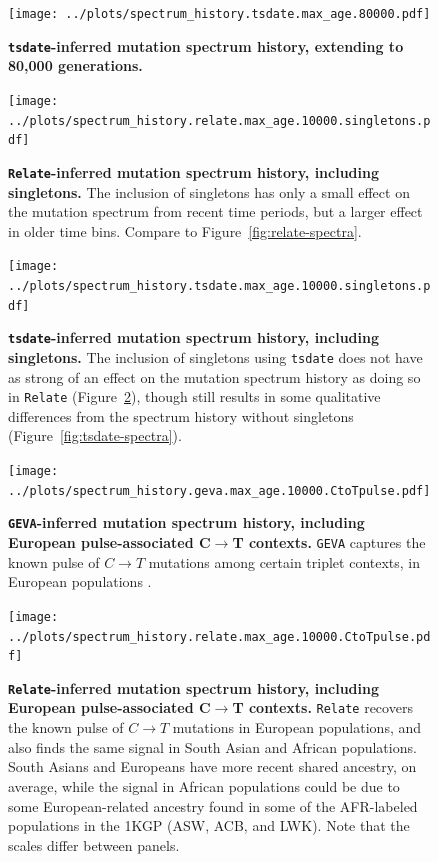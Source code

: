 \documentclass[]{article}
\newcommand{\GEVA}{\texttt{GEVA}\xspace}
\newcommand{\tsdate}{\texttt{tsdate}\xspace}
\newcommand{\relate}{\texttt{Relate}\xspace}
\begin{document}
\begin{figure}[ht!]
    \centering
    \texttt{[image: ../plots/spectrum\_history.tsdate.max\_age.80000.pdf]}
    \caption{
        \textbf{\tsdate-inferred mutation spectrum history, extending to 80,000 generations.}
    }
    \label{fig:geva-spectra-80k}
\end{figure}


\begin{figure}[ht!]
    \centering
    \texttt{[image: ../plots/spectrum\_history.relate.max\_age.10000.singletons.pdf]}
    \caption{
        \textbf{\relate-inferred mutation spectrum history, including singletons.}
        The inclusion of singletons has only a small effect on the mutation spectrum from
        recent time periods, but a larger effect in older time bins.
        Compare to Figure~\ref{fig:relate-spectra}.
    }
    \label{fig:relate-spectra-singletons}
\end{figure}


\begin{figure}[ht!]
    \centering
    \texttt{[image: ../plots/spectrum\_history.tsdate.max\_age.10000.singletons.pdf]}
    \caption{
        \textbf{\tsdate-inferred mutation spectrum history, including singletons.}
        The inclusion of singletons using \tsdate does not have as strong of an effect
        on the mutation spectrum history as doing so in \relate
        (Figure~\ref{fig:relate-spectra-singletons}), though still results in some
        qualitative differences from the spectrum history without singletons
        (Figure~\ref{fig:tsdate-spectra}).
    }
    \label{fig:tsdate-spectra-singletons}
\end{figure}


\begin{figure}[ht!]
    \centering
    \texttt{[image: ../plots/spectrum\_history.geva.max\_age.10000.CtoTpulse.pdf]}
    \caption{
        \textbf{\GEVA-inferred mutation spectrum history, including European
            pulse-associated C$\rightarrow$T contexts.}
        \GEVA captures the known pulse of $C\rightarrow T$ mutations among certain
        triplet contexts, in European populations \citep{harris2015evidence}.
    }
    \label{fig:tsdate-spectra-singletons}
\end{figure}


\begin{figure}[ht!]
    \centering
    \texttt{[image: ../plots/spectrum\_history.relate.max\_age.10000.CtoTpulse.pdf]}
    \caption{
        \textbf{\relate-inferred mutation spectrum history, including European
            pulse-associated C$\rightarrow$T contexts.}
        \relate recovers the known pulse of $C\rightarrow T$ mutations in European
        populations, and also finds the same signal in South Asian and African
        populations. South Asians and Europeans have more recent shared ancestry, on
        average, while the signal in African populations could be due to some
        European-related ancestry found in some of the AFR-labeled populations in the
        1KGP (ASW, ACB, and LWK). Note that the scales differ between panels.
    }
    \label{fig:tsdate-spectra-singletons}
\end{figure}
\end{document}
